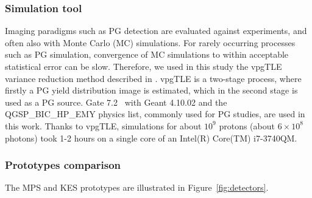 \documentclass[a4paper,english,12pt]{article}
\begin{document}
\subsubsection{Simulation tool}\label{sec:SimTool}

Imaging paradigms such as PG detection are evaluated against experiments, and often also with Monte Carlo (MC) simulations. %
For rarely occurring processes such as PG simulation, convergence of MC simulations to within acceptable statistical error can be slow. Therefore, we used in this study the vpgTLE variance reduction method described in \cite{Huisman2016}. vpgTLE is a two-stage process, where firstly a PG yield distribution image is estimated, which in the second stage is used as a PG source. Gate 7.2~\citep{Sarrut2014} with Geant 4.10.02 and the QGSP\_BIC\_HP\_EMY physics list, commonly used for PG studies, are used in this work. Thanks to vpgTLE, simulations for about $10^9$ protons (about $6\times10^8$ photons) took 1-2 hours on a single core of an Intel(R) Core(TM) i7-3740QM.


\subsubsection{Prototypes comparison}\label{sec:camera} %

The MPS and KES prototypes are illustrated in Figure~\ref{fig:detectors}.
\end{document}
